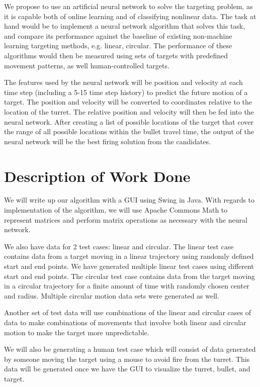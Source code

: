 \documentclass[11pt]{article}
\begin{document}
We propose to use an artificial neural network to solve the targeting problem, as it is capable both of online learning and of classifying nonlinear data. The task at hand would be to implement a neural network algorithm that solves this task, and compare its performance against the baseline of existing non-machine learning targeting methods, e.g. linear, circular. The performance of these algorithms would then be measured using sets of targets with predefined movement patterns, as well human-controlled targets.

The features used by the neural network will be position and velocity at each time step (including a 5-15 time step history) to predict the future motion of a target. The position and velocity will be converted to coordinates relative to the location of the turret. The relative position and velocity will then be fed into the neural network. After creating a list of possible locations of the target that cover the range of all possible locations within the bullet travel time, the output of the neural network will be the best firing solution from the candidates.

\section{Description of Work Done}
We will write up our algorithm with a GUI using Swing in Java. With regards to implementation of the algorithm, we will use Apache Commons Math to represent matrices and perform matrix operations as necessary with the neural network.

We also have data for 2 test cases: linear and circular. The linear test case contains data from a target moving in a linear trajectory using randomly defined start and end points. We have generated multiple linear test cases using different start and end points. The circular test case contains data from the target moving in a circular trajectory for a finite amount of time with randomly chosen center and radius. Multiple circular motion data sets were generated as well.

Another set of test data will use combinations of the linear and circular cases of data to make combinations of movements that involve both linear and circular motion to make the target more unpredictable.

We will also be generating a human test case which will consist of data generated by someone moving the target using a mouse to avoid fire from the turret. This data will be generated once we have the GUI to visualize the turret, bullet, and target.
\end{document}
